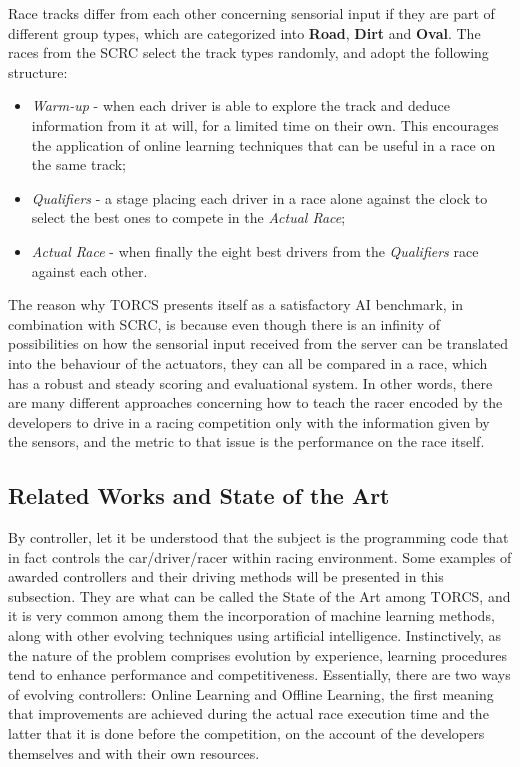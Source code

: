 	Race tracks differ from each other concerning sensorial input if they are part of different group types, which
	are categorized into \textbf{Road}, \textbf{Dirt} and \textbf{Oval}. The races from the SCRC select the track
	types randomly, and adopt the following structure:
	
		\begin{itemize}
			
			\item \emph{Warm-up} - when each driver is able to explore the track and deduce information from it	at
			will, for a limited time on their own. This encourages the application of online learning techniques
			that can be useful in a race on the same track;
			
			\item \emph{Qualifiers} - a stage placing each driver in a race alone against the clock to select the best
			ones to compete in the \emph{Actual Race};
			
			\item \emph{Actual Race} - when finally the eight best drivers from the \emph{Qualifiers} race against
			each other.
			
		\end{itemize}
	
	The reason why TORCS presents itself as a satisfactory AI benchmark, in combination with SCRC, is because even
	though there is an infinity of possibilities on how the sensorial input received from the server can be
	translated into the behaviour of the actuators, they can all be compared in a race, which has a robust and steady
	scoring and evaluational system. In other words, there are many different approaches concerning how to teach the
	racer encoded by the developers to drive in a racing competition only with the information given by the sensors,
	and the metric to that issue is the performance on the race itself.

\subsection{Related Works and State of the Art} \label{subsec:Related}
	
	By controller, let it be understood that the subject is the programming code that in fact controls the
	car/driver/racer within racing environment. Some examples of awarded controllers and their driving methods
	will be presented in this subsection. They are what can be called the State of the Art among TORCS, and it is
	very common among them the incorporation of machine learning methods, along with other evolving techniques
	using artificial intelligence. Instinctively, as the nature of the problem comprises evolution by experience,
	learning procedures tend to enhance performance and competitiveness. Essentially, there are two ways of
	evolving controllers: Online Learning and Offline Learning, the first meaning that improvements are achieved
	during the actual race execution time and the latter that it is done before the competition, on the account of
	the developers themselves and with their own resources.
	
